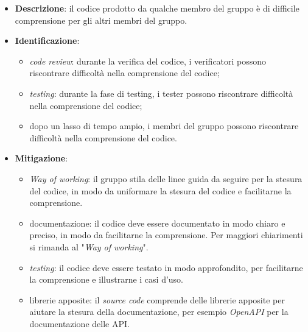 \label{risk:codice incomprensibile}
\begin{itemize}
	\item \textbf{Descrizione}: il codice prodotto da qualche membro del gruppo
	      è di difficile comprensione per gli altri membri del gruppo.
	\item \textbf{Identificazione}:
	      \begin{itemize}
		      \item \textit{code review}: durante la verifica del codice, i
		            verificatori possono riscontrare difficoltà nella comprensione
		            del codice;

		      \item \textit{testing}: durante la fase di testing, i tester possono
		            riscontrare difficoltà nella comprensione del codice;

		      \item dopo un lasso di tempo ampio, i membri del gruppo possono
		            riscontrare difficoltà nella comprensione del codice.
	      \end{itemize}
	\item \textbf{Mitigazione}:
	      \begin{itemize}
		      \item \textit{Way of working}: il gruppo stila delle linee guida
		            da seguire per la stesura del codice, in modo da uniformare
		            la stesura del codice e facilitarne la comprensione.

		      \item documentazione: il codice deve essere documentato in modo
		            chiaro e preciso, in modo da facilitarne la comprensione. Per
		            maggiori chiarimenti si rimanda al "\textit{Way of working}".

		      \item \textit{testing}: il codice deve essere testato in modo
		            approfondito, per facilitarne la comprensione e illustrarne
		            i casi d'uso.

		      \item librerie apposite: il \textit{source code} comprende delle
		            librerie apposite per aiutare la stesura della
		            documentazione, per esempio \textit{OpenAPI} per la
		            documentazione delle API.
	      \end{itemize}
\end{itemize}
